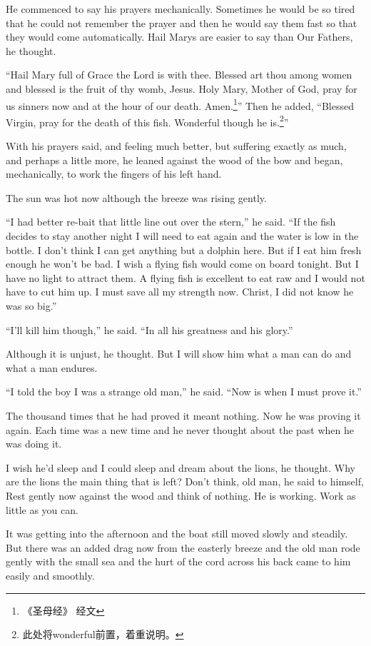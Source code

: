 \documentclass[fontset=ubuntu]{ctexrep}
\begin{document}
He commenced to say his \glspl{prayer} \gls{mechanically}. Sometimes he
would be so tired that he could not remember the prayer and then he would
say them fast so that they would come automatically. Hail Marys are easier
to say than Our Fathers, he thought.

``Hail Mary full of Grace the Lord is with thee. Blessed art thou among
women and blessed is the fruit of thy womb, Jesus. Holy Mary, Mother of God,
pray for us sinners now and at the hour of our death. Amen.\footnote{《圣母经》
  经文}'' Then he added, ``Blessed Virgin, pray for the death of this fish.
Wonderful though he is.\footnote{此处将wonderful前置，着重说明。}''

With his prayers said, and feeling much better, but suffering exactly as
much, and perhaps a little more, he leaned against the wood of the bow and
began, mechanically, to work the fingers of his left hand.

The sun was hot now although the breeze was rising gently.

``I had better re-bait that little line out over the stern,'' he said. ``If
the fish decides to stay another night I will need to eat again and the
water is low in the bottle. I don't think I can get anything but a dolphin
here. But if I eat him fresh enough he won't be bad. I wish a flying fish
would come on board tonight. But I have no light to \gls{attract} them. A flying
fish is excellent to eat raw and I would not have to cut him up. I must save
all my strength now. Christ, I did not know he was so big.''

``I'll kill him though,'' he said. ``In all his \gls{greatness} and his \gls{glory}.''

Although it is \gls{unjust}, he thought. But I will show him what a man can
do and what a man endures.

``I told the boy I was a strange old man,'' he said. ``Now is when I must
prove it.''

The thousand times that he had proved it meant nothing. Now he was proving
it again. Each time was a new time and he never thought about the past when
he was doing it.

I wish he'd sleep and I could sleep and dream about the lions, he thought.
Why are the lions the main thing that is left? Don't think, old man, he said
to himself, Rest gently now against the wood and think of nothing. He is
working. Work as little as you can.

It was getting into the afternoon and the boat still moved slowly and
steadily. But there was an added drag now from the easterly breeze and the
old man rode gently with the small sea and the hurt of the cord across his
back came to him easily and smoothly.
\end{document}
